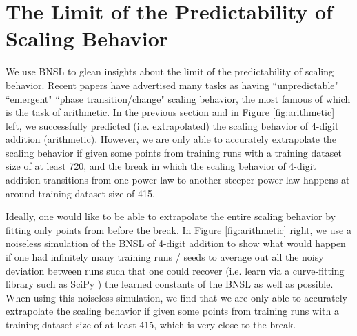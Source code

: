 \documentclass{article} %
\begin{document}
\section{The Limit of the Predictability of Scaling Behavior}
\label{section:limit_of_agi_superforecasting}
\vspace{-4.9mm}
We use BNSL to glean insights about the limit of the predictability of scaling behavior. Recent papers \citep{ganguli2022predictability, wei2022emergent} have advertised many tasks as having ``unpredictable" ``emergent" ``phase transition/change" scaling behavior, the most famous of which is the task of arithmetic. In the previous section and in Figure \ref{fig:arithmetic} left, we successfully predicted (i.e. extrapolated) the scaling behavior of 4-digit addition (arithmetic). However, we are only able to accurately extrapolate the scaling behavior if given some points from training runs with a training dataset size of at least 720, and the break in which the scaling behavior of 4-digit addition transitions from one power law to another steeper power-law happens at around training dataset size of 415. 

\vspace{-1.4mm}

Ideally, one would like to be able to extrapolate the entire scaling behavior by fitting only points from before the break. In Figure \ref{fig:arithmetic} right, we use a noiseless simulation of the BNSL of 4-digit addition to show what would happen if one had infinitely many training runs / seeds to average out all the noisy deviation between runs such that one could recover (i.e. learn via a curve-fitting library such as SciPy \citep{virtanen2020scipy}) the learned constants of the BNSL as well as possible. When using this noiseless simulation, we find that we are only able to accurately extrapolate the scaling behavior if given some points from training runs with a training dataset size of at least 415, which is very close to the break. 

\vspace{-1.4mm}



\end{document}
